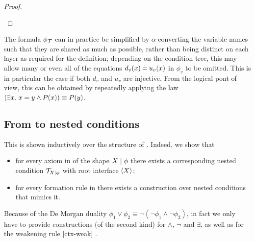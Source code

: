 \begin{proof}
\begin{description}



\end{description}
\end{proof}
%
The formula $\phi_{\mathcal{T}}$ can in practice be simplified by $\alpha$-converting the variable names such that they are shared as much as possible, rather than being distinct on each layer as required for the definition; depending on the condition tree, this may allow many or even all of the equations $d_v(x)\mathbin{\doteq} u_v(x)$ in $\phi_v$ to be omitted. This is in particular the case if both $d_v$ and $u_v$ are injective. From the logical pont of view, this can be obtained by repeatedly applying the law $\left( \exists x .\; x = y \wedge P(x)\right) \equiv P(y)$.

\subsection{From {\cfors} to nested conditions}


This is shown inductively over the structure of {\cfors}. Indeed, we show that 
\begin{itemize}
\item for every axiom in  of the shape ${X} \mid {\phi}$ there exists a corresponding {\proper} nested condition ${\mathcal{T}}_{{X} \mid {\phi}}$ with root interface $\langle X\rangle$;
\item for every formation rule in  there exists a construction over {\proper} nested conditions that mimics it.
\end{itemize}
%
%
Because of the De Morgan duality $\phi_1\vee \phi_2 \equiv \neg(\neg\phi_1\wedge \neg\phi_2)$, in fact we only have to provide constructions (of the second kind) for $\wedge$, $\neg$ and $\exists$, as well as for the weakening rule [ctx-weak] .

